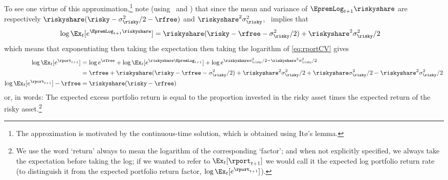 \documentclass{\handout}
\begin{document}
To see one virtue of this approximation,\footnote{The approximation is motivated by the continuous-time solution, which is obtained using It{\o}'s lemma.} note (using \NormTimes~and \SumNormsIsNorm) that since the mean and variance of $\EpremLog_{t+1} \riskyshare$ are respectively $\riskyshare(\risky - \sigma^{2}_{\risky}/2- \rfree)$ and $\riskyshare^{2} \sigma^{2}_{\risky}$, \LogELogNormTimes~implies that  
\begin{equation}\begin{gathered}\begin{aligned}
 \log \Ex_{t}[e^{\EpremLog_{t+1} \riskyshare}] & =  \riskyshare (\risky - \rfree - \sigma^{2}_{\risky}/2) + \riskyshare^{2}\sigma^{2}_{\risky}/2 
\end{aligned}\end{gathered}\end{equation}
which means that exponentiating then taking the expectation then taking the logarithm of \eqref{eq:rportCV} gives 
\begin{equation}\begin{gathered}\begin{aligned}
   \log \Ex_{t}[e^{\rport_{t+1}}] & =  \log e^{\rfree} + \log \Ex_{t}[e^{\riskyshare \EpremLog_{t+1}}] + \log e^{\riskyshare\sigma^{2}_{\risky}/2 - \riskyshare^{2}\sigma^{2}_{\risky}/2}
\\ & =  
\rfree + \riskyshare (\risky-\rfree-\sigma^{2}_{\risky}/2)+\riskyshare^{2}\sigma^{2}_{\risky}/2 +\riskyshare \sigma^{2}_{\risky}/2 - \riskyshare^{2}\sigma^{2}_{\risky}/2 
\\ \log \Ex_{t}[e^{\rport_{t+1}}] - \rfree & =   \riskyshare (\risky-\rfree) \label{eq:rportDist}
\end{aligned}\end{gathered}\end{equation}
or, in words: The expected excess portfolio return is equal to the proportion invested in the risky asset times the expected return of the risky asset.\footnote{We use the word `return' always to mean the logarithm of the corresponding `factor'; and when not explicitly specified, we always take the expectation before taking the log; if we wanted to refer to $\Ex_{t}[\rport_{t+1}]$ we would call it the expected log portfolio return rate (to distinguish it from the expected portfolio return factor, $\log \Ex_{t}[e^{\rport_{t+1}}]$).}

\pagebreak


\end{document}

